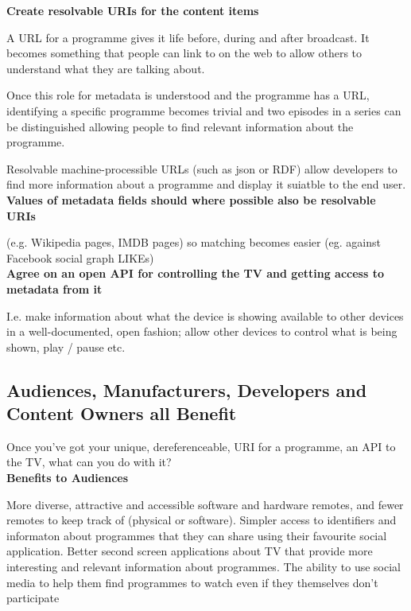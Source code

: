 \documentclass[]{article}%
\begin{document}
{\bf{Create resolvable URIs for the content items}}

A URL for a programme gives it life before, during and after broadcast. It becomes something that people can link to on the web to allow others to understand what they are talking about.

Once this role for metadata is understood and the programme has a URL, identifying a specific programme becomes trivial and two episodes in a series can be distinguished allowing people to find relevant information about the programme.

Resolvable machine-processible URLs (such as json or RDF) allow developers to find more information about a programme and display it suiatble to the end user.
\\

{\bf{Values of metadata fields should where possible also be resolvable URIs}}

(e.g. Wikipedia pages, IMDB pages) so matching becomes easier (eg. against Facebook social graph LIKEs)
\\

{\bf{Agree on an open API for controlling the TV and getting access to metadata from it}}

I.e. make information about what the device is showing available to other devices in a well-documented, open fashion; allow other devices to control what is being shown, play / pause etc.


\subsection{Audiences, Manufacturers, Developers and Content Owners all Benefit}

Once you've got your unique, dereferenceable, URI for a programme, an API to the TV, what can you do with it? 
\\

{\bf{Benefits to Audiences}}

More diverse, attractive and accessible software and hardware remotes, and fewer remotes to keep track of (physical or software). Simpler access to identifiers and informaton about programmes that they can share using their favourite social application. Better second screen applications about TV that provide more interesting and relevant information about programmes. The ability to use social media to help them find programmes to watch even if they themselves don't participate
\\
\end{document}
